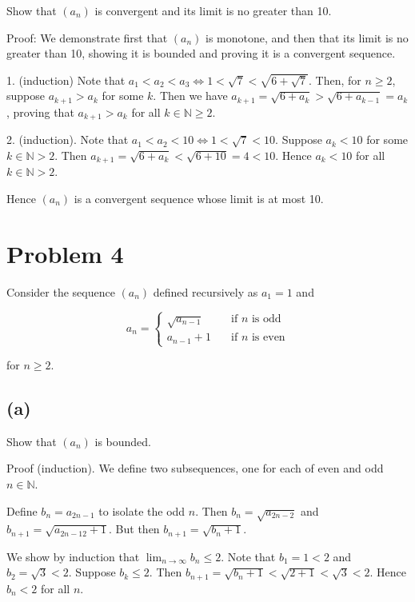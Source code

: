 \documentclass{article}
\begin{document}
Show that $(a_n)$ is convergent and its limit is no greater than 10. 

Proof: We demonstrate first that $(a_n)$ is monotone, and then that its limit is no greater than 10, showing it is bounded and proving it is a convergent sequence. 

1. (induction) Note that $a_1 < a_2 < a_3 \Leftrightarrow 1 < \sqrt{7} < \sqrt{6 + \sqrt{7}}$. Then, for $n \geq 2$, suppose $a_{k+1} > a_k$ for some $k$. Then we have $a_{k+1} = \sqrt{6 + a_k} > \sqrt{6 + a_{k-1}} = a_k$, proving that $a_{k+1} > a_k$ for all $k \in \mathbb{N} \geq 2$. 

2. (induction). Note that $a_1 < a_2 < 10 \Leftrightarrow 1 < \sqrt{7} < 10$. Suppose $a_k < 10$ for some $k \in \mathbb{N} > 2$. Then $a_{k+1} = \sqrt{6 + a_k} < \sqrt{6 + 10} = 4 < 10$. Hence $a_k < 10$ for all $k \in \mathbb{N} > 2$. 

Hence $(a_n)$ is a convergent sequence whose limit is at most 10. 

\section*{Problem 4}

Consider the sequence $(a_n)$ defined recursively as $a_1 = 1$ and  

\begin{equation*}
        a_n = \left\{ 
                \begin{array}{ll}
                        \sqrt{a_{n-1}} &\quad \text{if $n$ is odd} \\
                        a_{n-1} + 1   & \quad \text{if $n$ is even} 
                \end{array}
                \right.
\end{equation*}

for $n \geq 2$. 

\subsection*{(a)}

Show that $(a_n)$ is bounded. 

Proof (induction). We define two subsequences, one for each of even and odd $n \in \mathbb{N}$. 

Define $b_n = a_{2n - 1}$ to isolate the odd $n$. Then $b_n = \sqrt{a_{2n-2}}$ and $b_{n+1} = \sqrt{a_{2n - 12} + 1}$. But then $b_{n+1} = \sqrt{b_n + 1}$.

We show by induction that $\lim_{n\rightarrow \infty} b_n \leq 2$. Note that $b_1 = 1 < 2$ and $b_2 = \sqrt{3} < 2$. Suppose $b_k \leq 2$. Then $b_{n+1} = \sqrt{b_n + 1} < \sqrt{2 + 1} < \sqrt{3} < 2$. Hence $b_n < 2$ for all $n$. 
\end{document}

